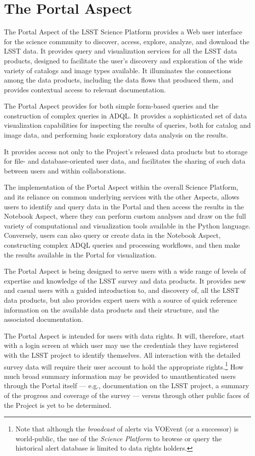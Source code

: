 \section{The Portal Aspect}\label{portal-aspect}

The Portal Aspect of the LSST Science Platform provides a Web user interface for the science community to discover, access, explore, analyze, and download the LSST data.
It provides query and visualization services for all the LSST data products, designed to facilitate the user's discovery and exploration of the wide variety of catalogs and image types available.
It illuminates the connections among the data products, including the data flows that produced them, and provides contextual access to relevant documentation.

The Portal Aspect provides for both simple form-based queries and the construction of complex queries in ADQL.
It provides a sophisticated set of data visualization capabilities for inspecting the results of queries, both for catalog and image data, and performing basic exploratory data analysis on the results.

It provides access not only to the Project's released data products but to storage for file- and database-oriented user data, and facilitates the sharing of such data between users and within collaborations.

The implementation of the Portal Aspect within the overall Science Platform, and its reliance on common underlying services with the other Aspects, allows users to identify and query data in the Portal and then access the results in the Notebook Aspect, where they can perform custom analyses and draw on the full variety of computational and visualization tools available in the Python language.
Conversely, users can also query or create data in the Notebook Aspect, constructing complex ADQL queries and processing workflows, and then make the results available in the Portal for visualization.

The Portal Aspect is being designed to serve users with a wide range of levels of expertise and knowledge of the LSST survey and data products.
It provides new and casual users with a guided introduction to, and discovery of, all the LSST data products, but also provides expert users with a source of quick reference information on the available data products and their structure, and the associated documentation.

The Portal Aspect is intended for users with data rights.
It will, therefore, start with a login screen at which user may use the credentials they have registered with the LSST project to identify themselves.
All interaction with the detailed survey data will require their user account to hold the appropriate rights.\footnote{Note that although the \emph{broadcast} of alerts via VOEvent (or a successor) is world-public, the use of the \emph{Science Platform} to browse or query the historical alert database is limited to data rights holders.}
How much broad summary information may be provided to unauthenticated users through the Portal itself --- e.g., documentation on the LSST project, a summary of the progress and coverage of the survey --- versus through other public faces of the Project is yet to be determined.

